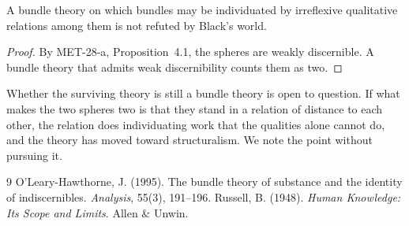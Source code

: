 \documentclass{situationist-preprint}
\begin{document}
\begin{proposition}\label{p:weak}
A bundle theory on which bundles may be individuated by irreflexive qualitative relations among them is not refuted by Black's world.
\end{proposition}

\begin{proof}
By MET-28-a, Proposition~4.1, the spheres are weakly discernible. A bundle theory that admits weak discernibility counts them as two.
\end{proof}

Whether the surviving theory is still a bundle theory is open to question. If what makes the two spheres two is that they stand in a relation of distance to each other, the relation does individuating work that the qualities alone cannot do, and the theory has moved toward structuralism. We note the point without pursuing it.

\begin{thebibliography}{9}\small
{} O'Leary-Hawthorne, J. (1995). The bundle theory of substance and the identity of indiscernibles. \emph{Analysis}, 55(3), 191--196.
 Russell, B. (1948). \emph{Human Knowledge: Its Scope and Limits}. Allen \& Unwin.
\end{thebibliography}
\end{document}
